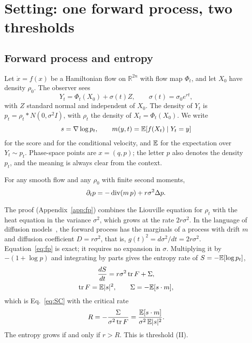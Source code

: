 \section{Setting: one forward process, two thresholds}
\label{sec:setting}

\subsection{Forward process and entropy}

Let $\dot x = f(x)$ be a Hamiltonian flow on $\mathbb{R}^{2n}$ with flow map $\Phi_t$, and let $X_0$ have density $\rho_0$. The observer sees
\begin{equation}
Y_t = \Phi_t(X_0) + \sigma(t) Z, \qquad \sigma(t) = \sigma_0 e^{rt},
\label{eq:forward}
\end{equation}
with $Z$ standard normal and independent of $X_0$. The density of $Y_t$ is $p_t = \rho_t * N(0,\sigma^2 I)$, with $\rho_t$ the density of $X_t = \Phi_t(X_0)$. We write
\begin{equation}
s = \nabla \log p_t, \qquad m(y,t) = \mathbb{E}[f(X_t) \mid Y_t = y]
\end{equation}
for the score and for the conditional velocity, and $\mathbb{E}$ for the expectation over $Y_t \sim p_t$. Phase-space points are $x = (q, p)$; the letter $p$ also denotes the density $p_t$, and the meaning is always clear from the context.

\begin{proposition}
\label{prop:fp}
For any smooth flow and any $\rho_0$ with finite second moments,
\begin{equation}
\partial_t p = -\operatorname{div}(m\,p) + r\sigma^2 \Delta p .
\label{eq:fp}
\end{equation}
\end{proposition}
The proof (Appendix~\ref{app:fp}) combines the Liouville equation for $\rho_t$ with the heat equation in the variance $\sigma^2$, which grows at the rate $2r\sigma^2$. In the language of diffusion models~\cite{song2021}, the forward process has the marginals of a process with drift $m$ and diffusion coefficient $D = r\sigma^2$, that is, $g(t)^2 = d\sigma^2/dt = 2r\sigma^2$. Equation~\eqref{eq:fp} is exact; it requires no expansion in $\sigma$. Multiplying it by $-(1+\log p)$ and integrating by parts gives the entropy rate of $S = -\mathbb{E}[\log p_t]$,
\begin{gather}
\frac{dS}{dt} = r\sigma^2 \operatorname{tr} F + \Sigma, \label{eq:Sdot}\\
\operatorname{tr} F = \mathbb{E}|s|^2, \qquad \Sigma = -\mathbb{E}[s\cdot m], \nonumber
\end{gather}
which is Eq.~\eqref{eq:SC} with the critical rate
\begin{equation}
R = -\frac{\Sigma}{\sigma^2 \operatorname{tr} F} = \frac{\mathbb{E}[s\cdot m]}{\sigma^2\,\mathbb{E}|s|^2}.
\label{eq:R}
\end{equation}
The entropy grows if and only if $r > R$. This is threshold (II).

